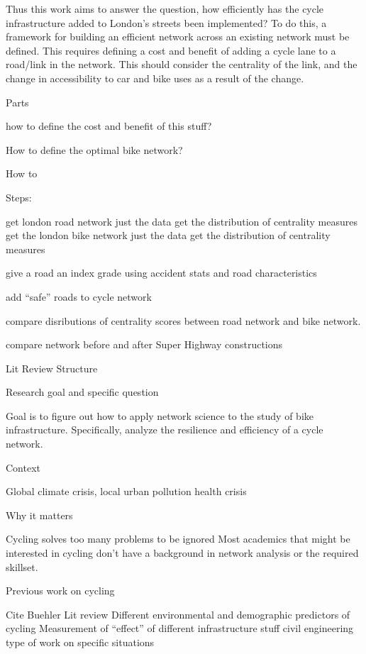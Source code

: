 \documentclass[11pt]{article} %
\begin{document}
	Thus this work aims to answer the question, how efficiently has the cycle infrastructure added to London's streets been implemented? To do this, a framework for building an efficient network across an existing network must be defined. This requires defining a cost and benefit of adding a cycle lane to a road/link in the network. This should consider the centrality of the link, and the change in accessibility to car and bike uses as a result of the change.
	
	Parts
	
how to define the cost and benefit of this stuff?

How to define the optimal bike network?

How to 




Steps:

	get london road network
		just the data
		get the distribution of centrality measures
	get the london bike network
		just the data
		get the distribution of centrality measures
		
	give a road an index grade
		using accident stats and road characteristics
		
	add ``safe'' roads to cycle network
	
	compare disributions of centrality scores between road network and bike network. 
	
	compare network before and after Super Highway constructions
	
	
	
	
	
Lit Review Structure

	Research goal  and specific question
	
		Goal is to figure out how to apply network science to the study of bike infrastructure. Specifically, analyze the resilience and efficiency of a cycle network. 
	
	Context
	
		Global climate crisis, 
		local urban pollution
		health crisis

	Why it matters
		
		Cycling solves too many problems to be ignored
		Most academics that might be interested in cycling don't have a background in network analysis or the required skillset. 
	
	Previous work on cycling
	
		Cite Buehler Lit review
		Different environmental and demographic predictors of cycling
		Measurement of ``effect'' of different infrastructure stuff
		civil engineering type of work on specific situations
	
\end{document}
